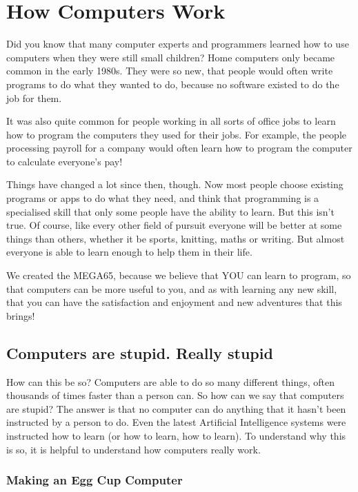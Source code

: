 \chapter{How Computers Work}

Did you know that many computer experts and programmers learned how to
use computers when they were still small children?
Home computers only became common in the early 1980s. They were so new,
that people would often write programs to do
what they wanted to do, because no software existed to do the job for them.

It was also quite common for people working in all
sorts of office jobs to learn how to program the computers they used for
their jobs.  For example, the people processing payroll
for a company would often learn how to program the computer to calculate
everyone's pay!

Things have changed a lot since then, though.
Now most people choose existing programs or apps to do what they need,
and think that programming is a specialised skill that only some people
have the ability to learn.
But this isn't true.  Of course, like every other field of pursuit
everyone will be better at some things than others,
whether it be sports, knitting, maths or writing. But almost
everyone is able to learn enough to help them in their life.

We created the MEGA65, because we believe that YOU can learn to
program, so that computers can be more useful to you, and as with
learning any new skill, that you can have the satisfaction and enjoyment
and new adventures that this brings!


\section{Computers are stupid. Really stupid}

How can this be so? Computers are able to do so many different things, often thousands of times faster than a person can.
So how can we say that computers are stupid?  The answer is that no computer can do anything that it hasn't been instructed
by a person to do.  Even the latest Artificial Intelligence systems were instructed how to learn (or how to learn, how to learn).
To understand why this is so, it is helpful to understand how computers really work.

\subsection{Making an Egg Cup Computer}

